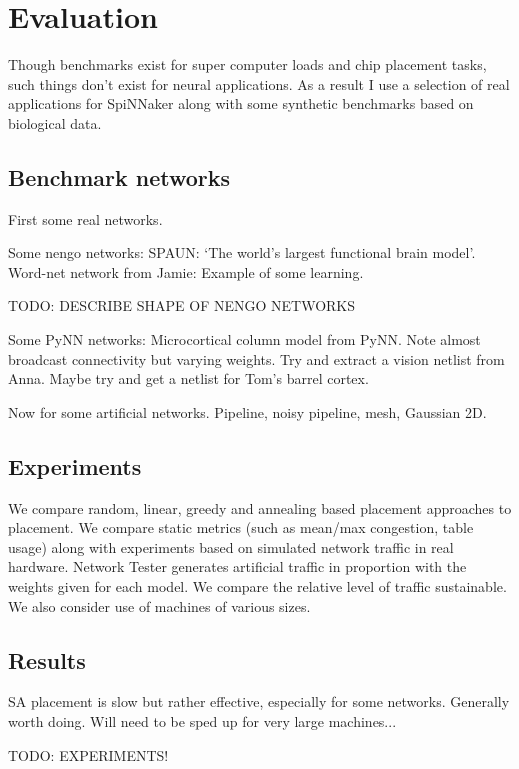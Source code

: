 	\section{Evaluation}
		
		\label{sec:placement-results}
		
		Though benchmarks exist for super computer loads and chip placement tasks,
		such things don't exist for neural applications. As a result I use a
		selection of real applications for SpiNNaker along with some synthetic
		benchmarks based on biological data.
		
		\subsection{Benchmark networks}
			
			First some real networks.
			
			Some nengo networks: SPAUN: `The world's largest functional brain model'.
			Word-net network from Jamie: Example of some learning.
			
			TODO: DESCRIBE SHAPE OF NENGO NETWORKS
			
			Some PyNN networks: Microcortical column model from PyNN. Note almost
			broadcast connectivity but varying weights. Try and extract a vision
			netlist from Anna. Maybe try and get a netlist for Tom's barrel cortex.
			
			Now for some artificial networks. Pipeline, noisy pipeline, mesh,
			Gaussian 2D.
		
		\subsection{Experiments}
			
			We compare random, linear, greedy and annealing based placement
			approaches to placement. We compare static metrics (such as mean/max
			congestion, table usage) along with experiments based on simulated
			network traffic in real hardware. Network Tester generates artificial
			traffic in proportion with the weights given for each model. We compare
			the relative level of traffic sustainable. We also consider use of
			machines of various sizes.
		
		\subsection{Results}
			
			SA placement is slow but rather effective, especially for some networks.
			Generally worth doing. Will need to be sped up for very large machines...
			
			TODO: EXPERIMENTS!
	
